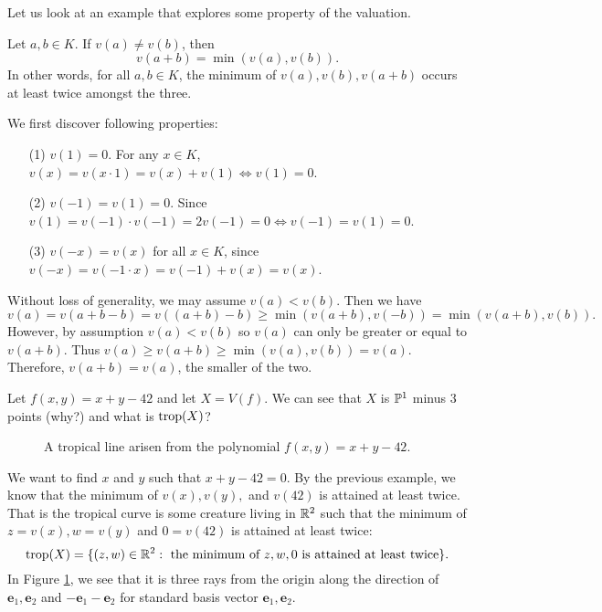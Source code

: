     Let us look at an example that explores some property of the valuation. 
    \begin{example}
    	Let $a, b \in K$. If $v(a) \ne v(b)$, then
	\[
	v(a + b) = \min(v(a), v(b)).
	\]
	In other words, 
	for all $a, b \in K$,
	the minimum of $v(a), v(b), v(a + b)$ occurs at least twice
	amongst the three.

	We first discover following properties:
	\begin{enumerate}
		\item[(1)] $v(1) = 0$. For any $x \in K$, $v(x) = v(x \cdot 1) = v(x) + v(1) \Leftrightarrow v(1) = 0$. 
		\item[(2)] $v(-1) = v(1) = 0$. Since $v(1) = v(-1) \cdot v(-1) = 2v(-1) = 0 \Leftrightarrow v(-1) = v(1) = 0$.
		\item[(3)] $v(-x) = v(x)$ for all $x \in K$, since $v(-x) = v(-1 \cdot x) = v(-1) + v(x) = v(x)$.
	\end{enumerate}
	Without loss of generality, we may assume $v(a) < v(b)$.
	Then we have 
	\[
	v(a) = v(a + b - b) = v((a+b) - b) \ge \min(v(a+ b), v(-b)) = \min(v(a+b), v(b)).
	\]
	However, by assumption $v(a) < v(b)$ so $v(a)$ can only be greater or equal to $v(a+b)$. 
	Thus $v(a) \ge v(a+b) \ge \min(v(a), v(b)) = v(a)$.
	Therefore, $v(a + b) = v(a)$, the smaller of the two. 
    \end{example}
    
    \begin{example}
    	Let $f(x, y) = x + y - 42$ and let $X = V(f)$. 
	    We can see that $X$ is $\P^1$ minus $3$ points (why?) 
	    and what is $\trop(X)$? 
	
	\begin{figure}
	\begin{center}
	\end{center}
	\caption{A tropical line arisen from the polynomial $f(x, y) = x + y - 42$.}
	\label{fig:tropical-line}
    \end{figure}
	
	We want to find $x$ and $y$ such that $x + y - 42 = 0$.
	By the previous example, we know that 
	the minimum of $v(x), v(y),$ and $v(42)$ is attained at least twice.
	That is the tropical curve is some creature living in $\R^2$ such that 
	the minimum of $z = v(x), w = v(y)$ and $0 = v(42)$ is attained
	at least twice:
	\[
	\trop(X) = \{(z, w) \in \R^2: \text{ the minimum of $z, w, 0$ is attained at least twice}\}.
	\]
	In Figure \ref{fig:tropical-line}, we see that it is three rays from the origin 
	along the direction of $\mathbf{e}_1, \mathbf{e}_2$ and $-\mathbf{e}_1-\mathbf{e}_2$ 
	for standard basis vector $\mathbf{e}_1, \mathbf{e}_2$. 
    \end{example}
   
